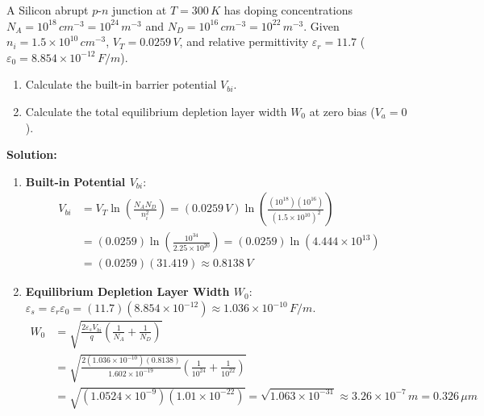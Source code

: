 \begin{example}
A Silicon abrupt $p$-$n$ junction at $T = 300\,\si{K}$ has doping concentrations $N_A = 10^{18}\,\si{cm^{-3}} = 10^{24}\,\si{m^{-3}}$ and $N_D = 10^{16}\,\si{cm^{-3}} = 10^{22}\,\si{m^{-3}}$. Given $n_i = 1.5 \times 10^{10}\,\si{cm^{-3}}$, $V_T = 0.0259\,\si{V}$, and relative permittivity $\varepsilon_r = 11.7$ ($\varepsilon_0 = 8.854 \times 10^{-12}\,\si{F/m}$).
\begin{enumerate}
    \item Calculate the built-in barrier potential $V_{bi}$.
    \item Calculate the total equilibrium depletion layer width $W_0$ at zero bias ($V_a = 0$).
\end{enumerate}

\textbf{Solution:}
\begin{enumerate}
    \item \textbf{Built-in Potential $V_{bi}$}:
    \begin{align*}
        V_{bi} &= V_T \ln\left(\frac{N_A N_D}{n_i^2}\right) = (0.0259\,\si{V})\ln\left(\frac{(10^{18})(10^{16})}{(1.5 \times 10^{10})^2}\right) \\
        &= (0.0259)\ln\left(\frac{10^{34}}{2.25 \times 10^{20}}\right) = (0.0259)\ln(4.444 \times 10^{13}) \\
        &= (0.0259)(31.419) \approx 0.8138\,\si{V}
    \end{align*}
    
    \item \textbf{Equilibrium Depletion Layer Width $W_0$}:\\
    $\varepsilon_s = \varepsilon_r \varepsilon_0 = (11.7)(8.854 \times 10^{-12}) \approx 1.036 \times 10^{-10}\,\si{F/m}$.
    \begin{align*}
        W_0 &= \sqrt{\frac{2\varepsilon_s V_{bi}}{q}\left(\frac{1}{N_A} + \frac{1}{N_D}\right)} \\
        &= \sqrt{\frac{2(1.036 \times 10^{-10})(0.8138)}{1.602 \times 10^{-19}}\left( \frac{1}{10^{24}} + \frac{1}{10^{22}} \right)} \\
        &= \sqrt{(1.0524 \times 10^{-9})(1.01 \times 10^{-22})} = \sqrt{1.063 \times 10^{-31}} \approx 3.26 \times 10^{-7}\,\si{m} = 0.326\,\si{\mu m}
    \end{align*}
\end{enumerate}
\end{example}

